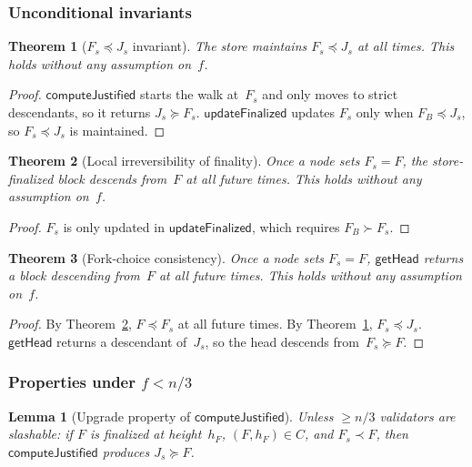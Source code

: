 \ifx\litemode\undefined\documentclass{article}\fi
\theoremstyle{plain}
\newtheorem{theorem}{Theorem}
\newtheorem{lemma}{Lemma}
\theoremstyle{definition}
\theoremstyle{remark}
\begin{document}
\subsubsection*{Unconditional invariants}

\begin{theorem}[$F_s \preceq J_s$ invariant]\label{thm:fleqj}
The store maintains $F_s \preceq J_s$ at all times.
This holds without any assumption on~$f$.
\end{theorem}

\begin{proof}
$\textsf{computeJustified}$ starts the walk at~$F_s$ and only moves to strict descendants, so it returns $J_s \succeq F_s$.
$\textsf{updateFinalized}$ updates $F_s$ only when $F_B \preceq J_s$, so $F_s \preceq J_s$ is maintained.
\end{proof}

\begin{theorem}[Local irreversibility of finality]\label{thm:finperm}
Once a node sets $F_s = F$, the store-finalized block descends from~$F$ at all future times.
This holds without any assumption on~$f$.
\end{theorem}

\begin{proof}
$F_s$ is only updated in $\textsf{updateFinalized}$, which requires $F_B \succ F_s$.
\end{proof}

\begin{theorem}[Fork-choice consistency]\label{thm:fcconsistency}
Once a node sets $F_s = F$, $\textsf{getHead}$ returns a block descending from~$F$ at all future times.
This holds without any assumption on~$f$.
\end{theorem}

\begin{proof}
By Theorem~\ref{thm:finperm}, $F \preceq F_s$ at all future times.
By Theorem~\ref{thm:fleqj}, $F_s \preceq J_s$.
$\textsf{getHead}$ returns a descendant of~$J_s$, so the head descends from~$F_s \succeq F$.
\end{proof}

\subsubsection*{Properties under $f < n/3$}

\begin{lemma}[Upgrade property of $\textsf{computeJustified}$]\label{lem:upgrade}
Unless $\geq n/3$ validators are slashable: if $F$ is finalized at height~$h_F$, $(F, h_F) \in C$, and $F_s \prec F$, then $\textsf{computeJustified}$ produces $J_s \succeq F$.
\end{lemma}
\end{document}
